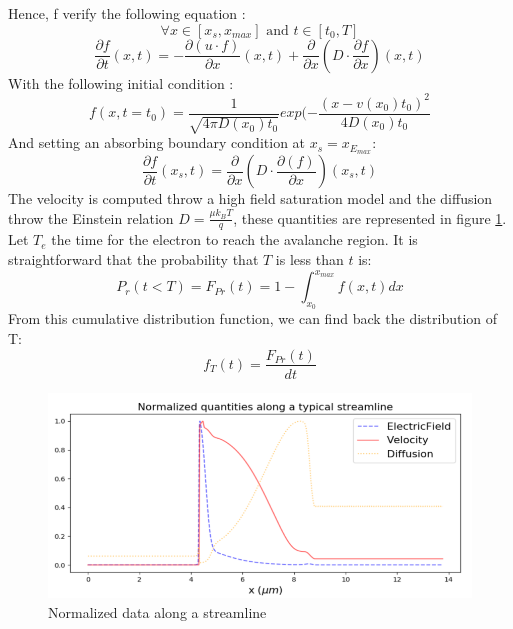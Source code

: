 \documentclass[10pt,a4paper,twocolumn]{article}
\begin{document}
 Hence, f verify the following equation : 
 \[ \forall x \in \left[ x_s, x_{max} \right]  \text{ and } t \in \left[ t_0, T \right] \]
\begin{equation}\label{eq:GeneralAD}
\frac{\partial f}{\partial t}(x,t) = 
	- \frac{\partial( u \cdot f )}{\partial x}(x,t)
	+ \frac{\partial}{\partial x}\left(D \cdot \frac{\partial f }{\partial x}\right)(x,t)
\end{equation}
With the following initial condition : 
\begin{equation}
f(x, t=t_0) = \frac{1}{\sqrt{4 \pi D(x_0) t_0}} exp(-\frac{(x-v(x_0)t_0)^2}{4D(x_0)t_0}
\end{equation}
And setting an absorbing boundary condition at $x_s=x_{E_{max}}$:
\begin{equation}
\frac{\partial f}{\partial t}(x_s,t) = 
	\frac{\partial}{\partial x}\left(D \cdot \frac{\partial( f )}{\partial x}\right)(x_s,t)
\end{equation}
The velocity is computed throw a high field saturation model and the diffusion throw the Einstein relation $D = \frac{\mu k_B T}{q}$, these quantities are represented in figure \ref{fig:VelocityDiffusion}. 
Let $T_e$ the time for the electron to reach the avalanche region. It is straightforward that the probability that $T$ is less than $t$ is:
 \[P_r(t<T) =  F_{Pr}(t) = 1 - \int_{x_0}^{x_{max}} f(x, t) dx \]
From this cumulative distribution function, we can find back the distribution of T:
\begin{equation}
f_T (t) = \frac{F_{Pr}(t)}{dt}
\end{equation}
\begin{figure}[hbtp]
\caption{Normalized data along a  streamline}
\centering
\label{fig:VelocityDiffusion}
\includegraphics[scale=0.5]{../pictures/PythonVelocityDiffusionElectricField.png}
\end{figure}
\end{document}
